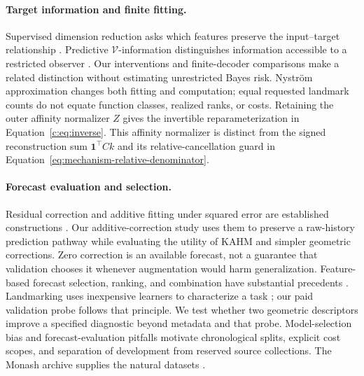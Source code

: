 \paragraph{Target information and finite fitting.}
Supervised dimension reduction asks which features preserve the input--target
relationship \citep{Fukumizu2004SDR}. Predictive $\mathcal V$-information
distinguishes information accessible to a restricted observer
\citep{Xu2020Usable}. Our interventions and finite-decoder comparisons
make a related distinction without estimating unrestricted Bayes risk.
Nystr\"om approximation \citep{Williams2001Nystrom,Rudi2015Nystrom} changes
both fitting and computation; equal requested landmark counts do not
equate function classes, realized ranks, or costs. Retaining the outer
affinity normalizer $Z$ gives the invertible reparameterization in Equation~\eqref{c:eq:inverse}.
This affinity normalizer is distinct from the signed reconstruction sum
$\mathbf1^\top Ck$ and its relative-cancellation guard in
Equation~\eqref{eq:mechanism-relative-denominator}.

\paragraph{Forecast evaluation and selection.}
Residual correction and additive fitting under squared error are
established constructions \citep{Buhlmann2003L2}. Our additive-correction study
uses them to preserve a raw-history prediction pathway while evaluating the
utility of KAHM and simpler geometric corrections. Zero correction is an
available forecast, not a guarantee that validation chooses it whenever
augmentation would harm generalization.
Feature-based forecast selection, ranking, and combination have substantial
precedents \citep{Prudencio2004MetaLearning,MonteroManso2020FFORMA,
Talagala2022FFORMPP,Talagala2023FFORMS}. Landmarking uses inexpensive
learners to characterize a task \citep{Pfahringer2000Landmarking}; our paid
validation probe follows that principle. We test whether
two geometric descriptors improve a specified diagnostic beyond metadata
and that probe. Model-selection bias \citep{Cawley2010Selection} and
forecast-evaluation pitfalls \citep{Hewamalage2023Evaluation} motivate
chronological splits, explicit cost scopes, and separation of development
from reserved source collections. The Monash archive supplies the natural
datasets \citep{Godahewa2021Monash}.

